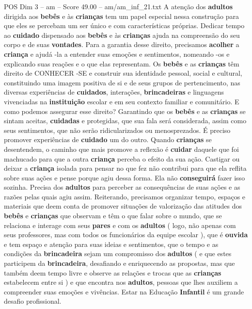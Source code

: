 \begin{textsample}{POS Dim 3 – am – Score 49.00 – am/am\_inf\_21.txt}
A atenção dos \textbf{adultos} dirigida aos \textbf{bebês} e às \textbf{crianças} tem um papel especial nessa construção para que eles se percebam um ser único e com características próprias.
Dedicar tempo ao \textbf{cuidado} dispensado aos \textbf{bebês} e às \textbf{crianças} ajuda na compreensão do seu corpo e de suas \textbf{vontades}.
Para a garantia desse direito, precisamos \textbf{acolher} a \textbf{criança} e ajudá -la a entender suas emoções e sentimentos, nomeando -os e explicando suas reações e o que elas representam.
Os \textbf{bebês} e as \textbf{crianças} têm direito de CONHECER -SE e construir sua identidade pessoal, social e cultural, constituindo uma imagem positiva de si e de seus grupos de pertencimento, nas diversas experiências de \textbf{cuidados}, interações, \textbf{brincadeiras} e linguagens vivenciadas na \textbf{instituição} escolar e em seu contexto familiar e comunitário.
E como podemos assegurar esse direito?
Garantindo que os \textbf{bebês} e as \textbf{crianças} se sintam aceitas, \textbf{cuidadas} e protegidas, que sua fala será considerada, assim como seus sentimentos, que não serão ridicularizados ou menosprezados.
É preciso promover experiências de \textbf{cuidado} um do outro.
Quando \textbf{crianças} se desentendem, o caminho que mais promove a reflexão é \textbf{cuidar} daquele que foi machucado para que a outra \textbf{criança} perceba o efeito da sua ação.
Castigar ou deixar a \textbf{criança} isolada para pensar no que fez não contribui para que ela reflita sobre suas ações e pense porque agiu dessa forma.
Ela não \textbf{conseguirá} fazer isso sozinha.
Precisa dos \textbf{adultos} para perceber as consequências de suas ações e as razões pelas quais agiu assim.
Reiterando, precisamos organizar tempo, espaços e materiais que deem conta de promover situações de valorização das atitudes dos \textbf{bebês} e \textbf{crianças} que observam e têm o que falar sobre o mundo, que se relaciona e interage com seus \textbf{pares} e com os \textbf{adultos} ( logo, não apenas com seus professores, mas com todos os funcionários da equipe escolar ), que é \textbf{ouvida} e tem espaço e atenção para suas ideias e sentimentos, que o tempo e as condições da \textbf{brincadeira} sejam um compromisso dos \textbf{adultos} ( e que estes participem da \textbf{brincadeira}, desafiando e enriquecendo as propostas, mas que também deem tempo livre e observe as relações e trocas que as \textbf{crianças} estabelecem entre si ) e que encontra nos \textbf{adultos}, pessoas que lhes auxiliem a compreender suas emoções e vivências.
Estar na Educação \textbf{Infantil} é um grande desafio profissional.

\end{textsample}
